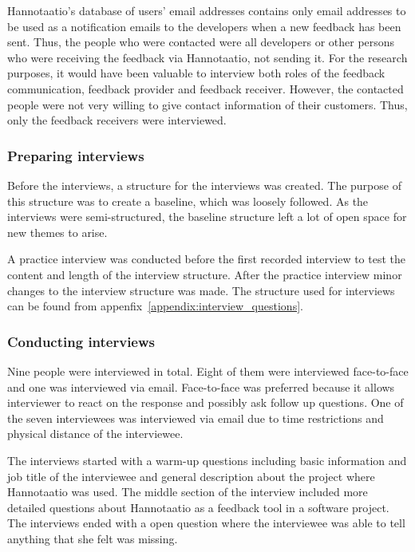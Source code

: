 \documentclass[english,12pt,a4paper,pdftex]{article}
\begin{document}
Hannotaatio's database of users' email addresses contains only email addresses to be used as a notification emails to the developers when a new feedback has been sent. Thus, the people who were contacted were all developers or other persons who were receiving the feedback via Hannotaatio, not sending it. For the research purposes, it would have been valuable to interview both roles of the feedback communication, feedback provider and feedback receiver. However, the contacted people were not very willing to give contact information of their customers. Thus, only the feedback receivers were interviewed.

\subsubsection{Preparing interviews}

Before the interviews, a structure for the interviews was created. The purpose of this structure was to create a baseline, which was loosely followed. As the interviews were semi-structured, the baseline structure left a lot of open space for new themes to arise.

A practice interview was conducted before the first recorded interview to test the content and length of the interview structure. After the practice interview minor changes to the interview structure was made. The structure used for interviews can be found from appenfix~\ref{appendix:interview_questions}.

\subsubsection{Conducting interviews}

Nine people were interviewed in total. Eight of them were interviewed face-to-face and one was interviewed via email. Face-to-face was preferred because it allows interviewer to react on the response and possibly ask follow up questions. One of the seven interviewees was interviewed via email due to time restrictions and physical distance of the interviewee.

The interviews started with a warm-up questions including basic information and job title of the interviewee and general description about the project where Hannotaatio was used. The middle section of the interview included more detailed questions about Hannotaatio as a feedback tool in a software project. The interviews ended with a open question where the interviewee was able to tell anything that she felt was missing.
\end{document}
